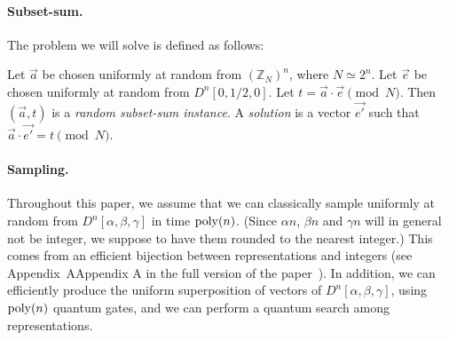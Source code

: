 \paragraph{Subset-sum.}The problem we will solve is defined as follows:
\begin{definition}
Let $\vec{a}$ be chosen uniformly at random from $\left(\mathbb{Z}_{N}\right)^n$, where $N \simeq 2^n$. Let $\vec{e}$ be chosen uniformly at random from $D^n[0, 1/2, 0]$. Let $t = \vec{a} \cdot \vec{e} \pmod{N}$. Then $(\vec{a}, t)$ is a \emph{random subset-sum instance}. A \emph{solution} is a vector $\vec{e'}$ such that $\vec{a} \cdot \vec{e'} = t \pmod{N}$.
\end{definition}


\paragraph{Sampling.}
Throughout this paper, we assume that we can classically sample uniformly at random from $D^n[\alpha, \beta, \gamma]$ in time $\operatorname{poly}(n)$. (Since $\alpha n$, $\beta n$ and $\gamma n$ will in general not be integer, we suppose to have them rounded to the nearest integer.)
This comes from an efficient bijection between representations and integers (see \ifeprint Appendix~A\else Appendix A in the full version of the paper~\cite{DBLP:journals/iacr/BonnetainBSS20}\fi).
In addition, we can efficiently produce the uniform superposition of vectors of $D^n[\alpha, \beta, \gamma]$, using $\operatorname{poly}(n)$ quantum gates, and we can perform a quantum search among representations.



